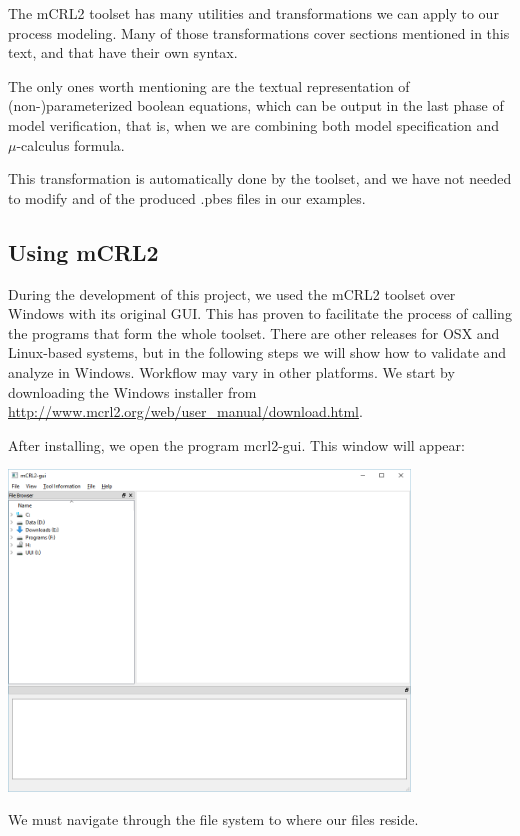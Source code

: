 \documentclass[11pt]{article}
\theoremstyle{definition}
\theoremstyle{plain}
\begin{document}
The mCRL2 toolset has many utilities and transformations we can apply to our process modeling. Many of those transformations cover sections mentioned in this text, and that have their own syntax.

The only ones worth mentioning are the textual representation of (non-)parameterized boolean equations, which can be output in the last phase of model verification, that is, when we are combining both model specification and $ \mu $-calculus formula.

This transformation is automatically done by the toolset, and we have not needed to modify and of the produced .pbes files in our examples.

\subsection{Using mCRL2}

During the development of this project, we used the mCRL2 toolset over Windows with its original GUI. This has proven to facilitate the process of calling the programs that form the whole toolset. There are other releases for OSX and Linux-based systems, but in the following steps we will show how to validate and analyze in Windows. Workflow may vary in other platforms. We start by downloading the Windows installer from \href{http://www.mcrl2.org/web/user_manual/download.html}{http://www.mcrl2.org/web/user\_manual/download.html}.

After installing, we open the program mcrl2-gui. This window will appear:

\includegraphics[width=0.8\textwidth, keepaspectratio]{img/mCRL2/mcrl2-intro.png}

We must navigate through the file system to where our files reside.
\end{document}
